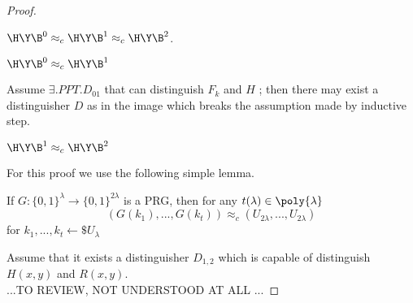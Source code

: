 \begin{proof}
    \begin{lemma}
$\H\Y\B^{0} \approx_{c} \H\Y\B^{1} \approx_{c} \H\Y\B^{2}$.
    \end{lemma}

    \begin{clm}
 $\H\Y\B^{0} \approx_{c} \H\Y\B^{1}$       
    \end{clm}

   Assume $ \exists .PPT. D_{01}$ that can distinguish $F_{k}$ and $H$ ; then
   there may exist a distinguisher $D$ as in the image which breaks the
   assumption made by inductive step.
\begin{figure}[h!]
   \centering
   \sdinit{}
\end{figure}

\begin{clm}
 $\H\Y\B^{1} \approx_{c} \H\Y\B^{2}$       
\end{clm}

For this proof we use the following simple lemma.
\begin{lem}
    If $ G:\{0,1\}^{\lambda} \to \{0,1\}^{2\lambda} $ is a PRG, then for any
    $t(\lambda) \in \poly{\lambda} $
    \[
        (G(k_{1}), ..., G(k_{t})) \approx_{c} (U_{2\lambda}, ..., U_{2\lambda})
    \]
    for $k_{1}, ..., k_{t} \leftarrow\$ U_{\lambda}$
\end{lem}

Assume that it exists a distinguisher $D_{1, 2}$ which is capable of distinguish
$H(x, y)$ and $R(x, y)$.\\

...TO REVIEW, NOT UNDERSTOOD AT ALL ...
\end{proof}

